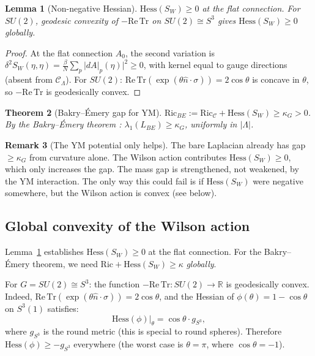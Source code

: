 \documentclass[11pt]{article}
\newtheorem{theorem}{Theorem}[section]
\newtheorem{lemma}[theorem]{Lemma}
\theoremstyle{definition}
\newtheorem{remark}[theorem]{Remark}
\newcommand{\calC}{\mathcal{C}}
\newcommand{\Ric}{\mathrm{Ric}}
\newcommand{\Hess}{\mathrm{Hess}}
\newcommand{\Tr}{\mathrm{Tr}}
\newcommand{\R}{\mathbb{R}}
\begin{document}
\begin{lemma}[Non-negative Hessian]\label{lem:hessian}
$\Hess(S_W) \geq 0$ at the flat connection. For $SU(2)$, geodesic convexity of $-\mathrm{Re}\,\Tr$ on $SU(2) \cong S^3$ gives $\Hess(S_W) \geq 0$ globally.
\end{lemma}

\begin{proof}
At the flat connection $A_0$, the second variation is $\delta^2 S_W(\eta,\eta) = \frac{\beta}{N}\sum_p |dA|_p(\eta)|^2 \geq 0$, with kernel equal to gauge directions (absent from $\calC_\Lambda$). For $SU(2)$: $\mathrm{Re}\,\Tr(\exp(\theta\hat{n}\cdot\sigma)) = 2\cos\theta$ is concave in $\theta$, so $-\mathrm{Re}\,\Tr$ is geodesically convex.
\end{proof}

\begin{theorem}[Bakry--\'Emery gap for YM]\label{thm:BE-gap}
$\Ric_{BE} := \Ric_\calC + \Hess(S_W) \geq \kappa_G > 0$. By the Bakry--\'Emery theorem \cite{BakryEmery85}: $\lambda_1(L_{BE}) \geq \kappa_G$, uniformly in $|\Lambda|$.
\end{theorem}

\begin{remark}[The YM potential only helps]\label{rem:helps}
The bare Laplacian already has gap $\geq \kappa_G$ from curvature alone. The Wilson action contributes $\Hess(S_W) \geq 0$, which only increases the gap. The mass gap is strengthened, not weakened, by the YM interaction. The only way this could fail is if $\Hess(S_W)$ were negative somewhere, but the Wilson action is convex (see below).
\end{remark}

\subsection{Global convexity of the Wilson action}

Lemma~\ref{lem:hessian} establishes $\Hess(S_W) \geq 0$ at the flat connection. For the Bakry--\'Emery theorem, we need $\Ric + \Hess(S_W) \geq \kappa$ \textit{globally}.

For $G = SU(2) \cong S^3$: the function $-\mathrm{Re}\,\Tr: SU(2) \to \R$ is geodesically convex. Indeed, $\mathrm{Re}\,\Tr(\exp(\theta\hat{n}\cdot\sigma)) = 2\cos\theta$, and the Hessian of $\phi(\theta) = 1 - \cos\theta$ on $S^3(1)$ satisfies:
\begin{equation}
    \Hess(\phi)\big|_\theta = \cos\theta \cdot g_{S^3},
\end{equation}
where $g_{S^3}$ is the round metric (this is special to round spheres). Therefore $\Hess(\phi) \geq -g_{S^3}$ everywhere (the worst case is $\theta = \pi$, where $\cos\theta = -1$).
\end{document}
